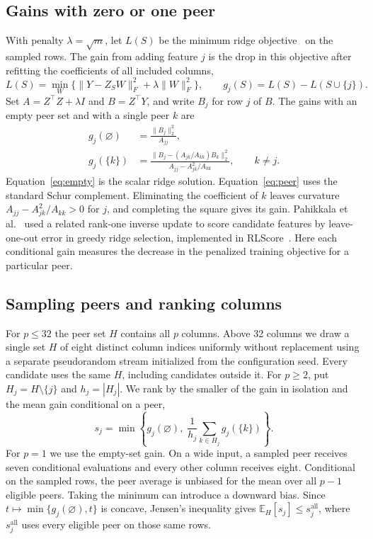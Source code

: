 \documentclass[11pt,a4paper]{article}
\newcommand{\gain}{g}
\begin{document}
\subsection{Gains with zero or one peer}
With penalty $\lambda=\sqrt m$, let $L(S)$ be the minimum ridge objective~\cite{ridge} on the sampled rows. The gain from adding feature $j$ is the drop in this objective after refitting the coefficients of all included columns,
\begin{equation}
 L(S)=\min_W\bigl\{\|Y-Z_SW\|_F^2+\lambda\|W\|_F^2\bigr\},
 \qquad \gain_j(S)=L(S)-L(S\cup\{j\}).\label{eq:loss}
\end{equation}
Set $A=Z^\top Z+\lambda I$ and $B=Z^\top Y$, and write $B_j$ for row $j$ of $B$. The gains with an empty peer set and with a single peer $k$ are
\begin{align}
 \gain_j(\varnothing)&=\frac{\|B_j\|_2^2}{A_{jj}},\label{eq:empty}\\
 \gain_j(\{k\})&=
 \frac{\|B_j-(A_{jk}/A_{kk})B_k\|_2^2}
 {A_{jj}-A_{jk}^2/A_{kk}},\qquad k\ne j.\label{eq:peer}
\end{align}
Equation~\eqref{eq:empty} is the scalar ridge solution. Equation~\eqref{eq:peer} uses the standard Schur complement. Eliminating the coefficient of $k$ leaves curvature $A_{jj}-A_{jk}^2/A_{kk}>0$ for $j$, and completing the square gives its gain. Pahikkala et al.~\cite[Eq.~(8)]{pahikkala} used a related rank-one inverse update to score candidate features by leave-one-out error in greedy ridge selection, implemented in RLScore~\cite{rlscore}. Here each conditional gain measures the decrease in the penalized training objective for a particular peer.

\subsection{Sampling peers and ranking columns}
For $p\le32$ the peer set $H$ contains all $p$ columns. Above 32 columns we draw a single set $H$ of eight distinct column indices uniformly without replacement using a separate pseudorandom stream initialized from the configuration seed. Every candidate uses the same $H$, including candidates outside it. For $p\ge2$, put $H_j=H\setminus\{j\}$ and $h_j=|H_j|$. We rank by the smaller of the gain in isolation and the mean gain conditional on a peer,
\begin{equation}
 s_j=\min\left\{\gain_j(\varnothing),\;
           \frac{1}{h_j}\sum_{k\in H_j}\gain_j(\{k\})\right\}.
 \label{eq:score}
\end{equation}
For $p=1$ we use the empty-set gain. On a wide input, a sampled peer receives seven conditional evaluations and every other column receives eight. Conditional on the sampled rows, the peer average is unbiased for the mean over all $p-1$ eligible peers. Taking the minimum can introduce a downward bias. Since $t\mapsto\min\{\gain_j(\varnothing),t\}$ is concave, Jensen's inequality gives $\mathbb{E}_H[s_j]\le s_j^{\mathrm{all}}$, where $s_j^{\mathrm{all}}$ uses every eligible peer on those same rows.
\end{document}
